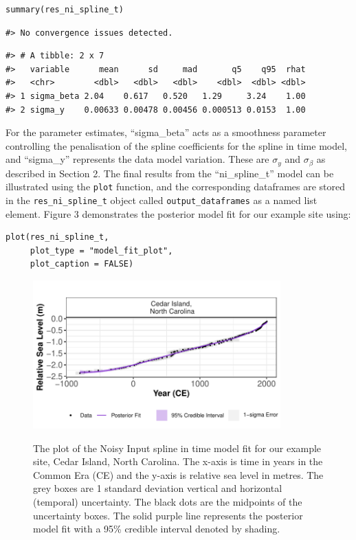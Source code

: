 \scriptsize
\begin{verbatim}
summary(res_ni_spline_t)
\end{verbatim}
\begin{verbatim}
#> No convergence issues detected.
\end{verbatim}
\begin{verbatim}
#> # A tibble: 2 x 7
#>   variable      mean      sd     mad       q5    q95  rhat
#>   <chr>        <dbl>   <dbl>   <dbl>    <dbl>  <dbl> <dbl>
#> 1 sigma_beta 2.04    0.617   0.520   1.29     3.24    1.00
#> 2 sigma_y    0.00633 0.00478 0.00456 0.000513 0.0153  1.00
\end{verbatim}
\normalsize
For the parameter estimates, ``sigma\_beta'' acts as a smoothness parameter controlling the penalisation of the spline coefficients for the spline in time model, and ``sigma\_y'' represents the data model variation. These are \(\sigma_y\) and \(\sigma_{\beta}\) as described in Section 2.
The final results from the ``ni\_spline\_t'' model can be illustrated using the \texttt{plot} function, and the corresponding dataframes are stored in the \texttt{res\_ni\_spline\_t} object called \texttt{output\_dataframes} as a named list element. Figure 3 demonstrates the posterior model fit for our example site using:
\scriptsize
\begin{verbatim}
plot(res_ni_spline_t,
     plot_type = "model_fit_plot",
     plot_caption = FALSE)
\end{verbatim}
\begin{figure}
{\centering \includegraphics[width=360px]{RJ-2024-018_files/figure-latex/nisplinemodfit-1} 
}
\caption{The plot of the Noisy Input spline in time model fit for our example site, Cedar Island, North Carolina. The x-axis is time in years in the Common Era (CE) and the y-axis is relative sea level in metres. The grey boxes are 1 standard deviation vertical and horizontal (temporal) uncertainty. The black dots are the midpoints of the uncertainty boxes. The solid purple line represents the posterior model fit with a 95\% credible interval denoted by shading.}\label{fig:nisplinemodfit}
\end{figure}
